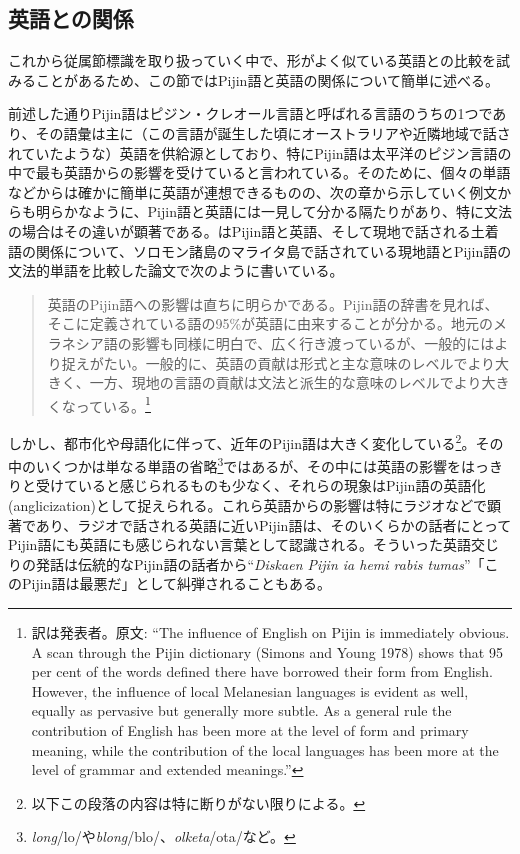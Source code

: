 \subsection{英語との関係}
これから従属節標識を取り扱っていく中で、形がよく似ている英語との比較を試みることがあるため、この節ではPijin語と英語の関係について簡単に述べる。

前述した通りPijin語はピジン・クレオール言語と呼ばれる言語のうちの1つであり、その語彙は主に（この言語が誕生した頃にオーストラリアや近隣地域で話されていたような）英語を供給源としており、特にPijin語は太平洋のピジン言語の中で最も英語からの影響を受けていると言われている\citep{nativization}。そのために、個々の単語などからは確かに簡単に英語が連想できるものの、次の章から示していく例文からも明らかなように、Pijin語と英語には一見して分かる隔たりがあり、特に文法の場合はその違いが顕著である。\cite{malaitan}はPijin語と英語、そして現地で話される土着語の関係について、ソロモン諸島のマライタ島で話されている現地語とPijin語の文法的単語を比較した論文で次のように書いている。

\begin{quotation}
  英語のPijin語への影響は直ちに明らかである。Pijin語の辞書\citep{yumi}を見れば、そこに定義されている語の95\%が英語に由来することが分かる。地元のメラネシア語の影響も同様に明白で、広く行き渡っているが、一般的にはより捉えがたい。一般的に、英語の貢献は形式と主な意味のレベルでより大きく、一方、現地の言語の貢献は文法と派生的な意味のレベルでより大きくなっている。\citep{malaitan}\footnote{訳は発表者。原文: ``The influence of English on Pijin is immediately obvious. A scan through the Pijin dictionary (Simons and Young 1978) shows that 95 per cent of the words defined there have borrowed their form from English. However, the influence of local Melanesian languages is evident as well, equally as pervasive but generally more subtle. As a general rule the contribution of English has been more at the level of form and primary meaning, while the contribution of the local languages has been more at the level of grammar and extended meanings.''}
\end{quotation}

しかし、都市化や母語化に伴って、近年のPijin語は大きく変化している\footnote{以下この段落の内容は特に断りがない限り\cite{nativization}による。}。その中のいくつかは単なる単語の省略\footnote{\textit{long}/lo/や\textit{blong}/blo/、\textit{olketa}/ota/など。}ではあるが、その中には英語の影響をはっきりと受けていると感じられるものも少なく、それらの現象はPijin語の英語化(anglicization)として捉えられる。これら英語からの影響は特にラジオなどで顕著であり、ラジオで話される英語に近いPijin語は、そのいくらかの話者にとってPijin語にも英語にも感じられない言葉として認識される。そういった英語交じりの発話は伝統的なPijin語の話者から``\textit{Diskaen Pijin ia hemi rabis tumas}''「このPijin語は最悪だ」として糾弾されることもある。

